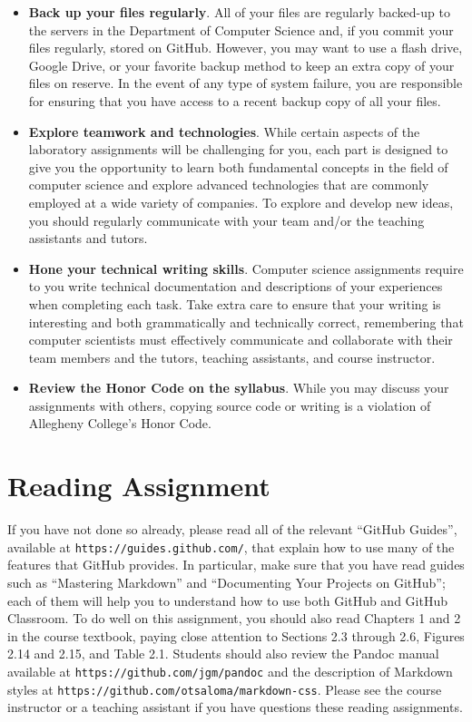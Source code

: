 \documentclass[11pt]{article}
\newcommand{\url}[1]{\lstinline{#1}}
\begin{document}
\begin{itemize}
\item {\bf Back up your files regularly}. All of your files are regularly backed-up to the servers in the Department of
  Computer Science and, if you commit your files regularly, stored on GitHub. However, you may want to use a flash
  drive, Google Drive, or your favorite backup method to keep an extra copy of your files on reserve. In the event of
  any type of system failure, you are responsible for ensuring that you have access to a recent backup copy of all your
  files.

\item {\bf Explore teamwork and technologies}. While certain aspects of the laboratory assignments will be challenging
  for you, each part is designed to give you the opportunity to learn both fundamental concepts in the field of computer
  science and explore advanced technologies that are commonly employed at a wide variety of companies. To explore and
  develop new ideas, you should regularly communicate with your team and/or the teaching assistants and tutors.

\item {\bf Hone your technical writing skills}. Computer science assignments require to you write technical
  documentation and descriptions of your experiences when completing each task. Take extra care to ensure that your
  writing is interesting and both grammatically and technically correct, remembering that computer scientists must
  effectively communicate and collaborate with their team members and the tutors, teaching assistants, and course
  instructor.

\item {\bf Review the Honor Code on the syllabus}. While you may discuss your assignments with others, copying source
  code or writing is a violation of Allegheny College's Honor Code.

\end{itemize}

\section*{Reading Assignment}

If you have not done so already, please read all of the relevant ``GitHub
Guides'', available at \url{https://guides.github.com/}, that explain how to use
many of the features that GitHub provides. In particular, make sure that you
have read guides such as ``Mastering Markdown'' and ``Documenting Your Projects
on GitHub''; each of them will help you to understand how to use both GitHub and
GitHub Classroom. To do well on this assignment, you should also read Chapters 1
and 2 in the course textbook, paying close attention to Sections 2.3 through
2.6, Figures 2.14 and 2.15, and Table 2.1. Students should also review the
Pandoc manual available at \url{https://github.com/jgm/pandoc} and the
description of Markdown styles at
\url{https://github.com/otsaloma/markdown-css}. Please see the course instructor
or a teaching assistant if you have questions these reading assignments.
\end{document}
